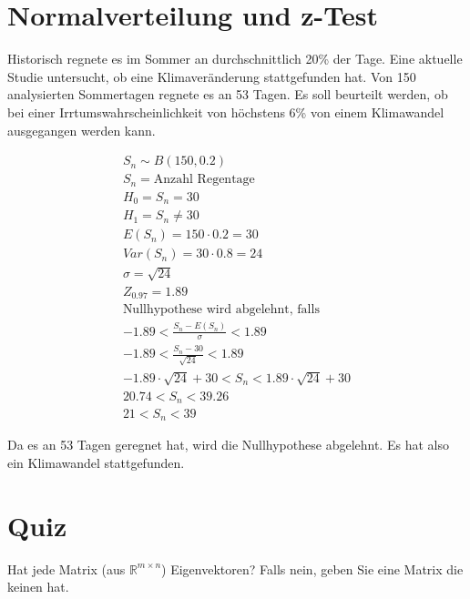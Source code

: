 \section{Normalverteilung und z-Test}

Historisch regnete es im Sommer an durchschnittlich 20\% der Tage. Eine
aktuelle Studie untersucht, ob eine Klimaveränderung stattgefunden hat. Von 150
analysierten Sommertagen regnete es an 53 Tagen. Es soll beurteilt werden, ob
bei einer Irrtumswahrscheinlichkeit von höchstens 6\% von einem Klimawandel
ausgegangen werden kann.

\begin{align*}
    S_n \sim B(150, 0.2)                                         \\
    S_n = \text{Anzahl Regentage}                                \\
    H_0 = S_n = 30                                               \\
    H_1 = S_n \neq 30                                            \\
    E(S_n) = 150 \cdot 0.2 = 30                                  \\
    Var(S_n) = 30 \cdot 0.8 = 24                                 \\
    \sigma = \sqrt{24}                                           \\
    Z_{0.97} = 1.89                                              \\
    \text{Nullhypothese wird abgelehnt, falls }                  \\
    -1.89 < \frac{S_n - E(S_n)}{\sigma} < 1.89                   \\
    -1.89 < \frac{S_n - 30}{\sqrt{24}} < 1.89                    \\
    -1.89 \cdot \sqrt{24} + 30 < S_n < 1.89 \cdot \sqrt{24} + 30 \\
    20.74 < S_n < 39.26                                          \\
    21 < S_n < 39
\end{align*}

Da es an 53 Tagen geregnet hat, wird die Nullhypothese abgelehnt. Es hat also
ein Klimawandel stattgefunden.

\section{Quiz}

Hat jede Matrix (aus $\mathbb{R}^{m \times n}$) Eigenvektoren? Falls nein,
geben Sie eine Matrix die keinen hat.

